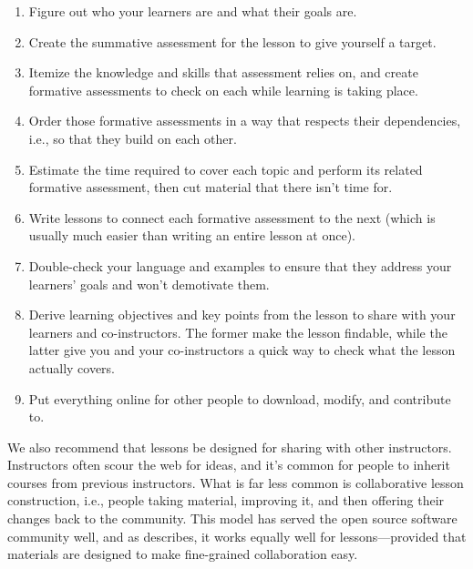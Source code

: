 \documentclass[10pt,letterpaper]{article}
\begin{document}
\begin{enumerate}

\item Figure out who your learners are and what their goals are.

\item Create the summative assessment for the lesson to give yourself a target.

\item Itemize the knowledge and skills that assessment relies on, and create
  formative assessments to check on each while learning is taking place.

\item Order those formative assessments in a way that respects their
  dependencies, i.e., so that they build on each other.

\item Estimate the time required to cover each topic and perform its related
  formative assessment, then cut material that there isn't time for.

\item Write lessons to connect each formative assessment to the next (which is
  usually much easier than writing an entire lesson at once).

\item Double-check your language and examples to ensure that they address
  your learners' goals and won't demotivate them.

\item Derive learning objectives and key points from the lesson to share with
  your learners and co-instructors.  The former make the lesson findable, while
  the latter give you and your co-instructors a quick way to check what the
  lesson actually covers.

\item Put everything online for other people to download, modify, and contribute
  to.
  
\end{enumerate}

We also recommend that lessons be designed for sharing with other instructors.
Instructors often scour the web for ideas, and it's common for people to inherit
courses from previous instructors.  What is far less common is collaborative
lesson construction, i.e., people taking material, improving it, and then
offering their changes back to the community.  This model has served the open
source software community well, and as \cite{Deve2018} describes, it works
equally well for lessons---provided that materials are designed to make
fine-grained collaboration easy.
\end{document}
